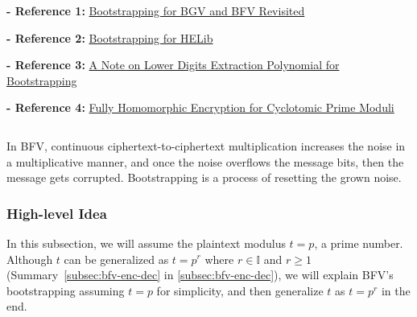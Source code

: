 \noindent \textbf{- Reference 1:} 
\href{https://eprint.iacr.org/2022/1363.pdf}{Bootstrapping for BGV and BFV Revisited}~\cite{cryptoeprint:2022/1363}


\noindent \textbf{- Reference 2:} 
\href{https://eprint.iacr.org/2014/873.pdf}{Bootstrapping for HELib}~\cite{10.1007/s00145-020-09368-7}

\noindent \textbf{- Reference 3:} 
\href{https://arxiv.org/pdf/1906.02867}{A Note on Lower Digits Extraction Polynomial for Bootstrapping}~\cite{huo2019notelowerdigitsextraction}

\noindent \textbf{- Reference 4:} 
\href{https://eprint.iacr.org/2024/1587.pdf}{Fully Homomorphic Encryption for Cyclotomic Prime Moduli}~\cite{cryptoeprint:2024/1587}



$ $

In BFV, continuous ciphertext-to-ciphertext multiplication increases the noise in a multiplicative manner, and once the noise overflows the message bits, then the message gets corrupted. Bootstrapping is a process of resetting the grown noise. 

\subsubsection{High-level Idea}
\label{subsubsec:bfv-bootstrapping-high-level}

In this subsection, we will assume the plaintext modulus $t = p$, a prime number. Although $t$ can be generalized as $t = p^r$ where $r \in \mathbb{I}$ and $r \geq 1$ (Summary~\ref*{subsec:bfv-enc-dec} in \autoref{subsec:bfv-enc-dec}), we will explain BFV's bootstrapping assuming $t=p$ for simplicity, and then generalize $t$ as $t = p^r$ in the end. 

